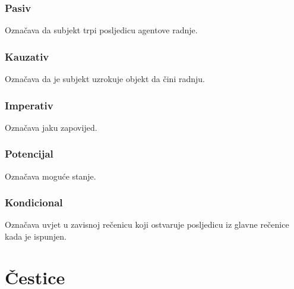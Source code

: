 \documentclass[a4paper, 12pt]{amsart}
\begin{document}
  \subsubsection{Pasiv}
  Označava da subjekt trpi posljedicu agentove radnje.

  \subsubsection{Kauzativ}
  Označava da je subjekt uzrokuje objekt da čini radnju.

  \subsubsection{Imperativ}
  Označava jaku zapovijed.

  \subsubsection{Potencijal}
  Označava moguće stanje.

  \subsubsection{Kondicional}
  Označava uvjet u zavisnoj rečenicu koji ostvaruje posljedicu iz glavne rečenice kada je ispunjen.

  \section{Čestice}
\end{document}
